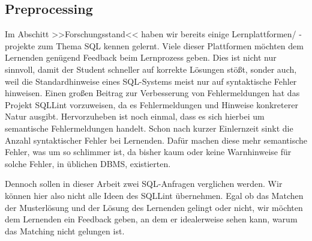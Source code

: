
\subsection{Preprocessing}
\label{subsec:preprocessing}

Im Abschitt >>Forschungsstand<< haben wir bereits einige Lernplattformen/ -projekte zum Thema SQL kennen gelernt. Viele dieser Plattformen möchten dem Lernenden genügend Feedback beim Lernprozess geben. Dies ist nicht nur sinnvoll, damit der Student schneller auf korrekte Lösungen stößt, sonder auch, weil die Standardhinweise eines SQL-Systems meist nur auf syntaktische Fehler hinweisen. Einen großen Beitrag zur Verbesserung von Fehlermeldungen hat das Projekt SQLLint vorzuweisen, da es Fehlermeldungen und Hinweise konkreterer Natur ausgibt. Hervorzuheben ist noch einmal, dass es sich hierbei um semantische Fehlermeldungen handelt. Schon nach kurzer Einlernzeit sinkt die Anzahl syntaktischer Fehler bei Lernenden. Dafür machen diese mehr semantische Fehler, was um so schlimmer ist, da bisher kaum oder keine Warnhinweise für solche Fehler, in üblichen DBMS, existierten. 

Dennoch sollen in dieser Arbeit zwei SQL-Anfragen verglichen werden. Wir können hier also nicht alle Ideen des SQLLint übernehmen. Egal ob das Matchen der Musterlösung und der Lösung des Lernenden gelingt oder nicht, wir möchten dem Lernenden ein Feedback geben, an dem er idealerweise sehen kann, warum das Matching nicht gelungen ist. 

